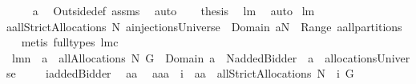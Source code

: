 \begin{isabellebody}
\ \isamarkupfalse%
\ {\isachardoublequoteopen}{\isachardot}{\isachardot}{\isachardot}\ {\isacharequal}\ a{\isachardoublequoteclose}\ \isamarkupfalse%
\ Outside{\isacharunderscore}def\ assms{\isacharparenleft}{}{\isacharparenright}\ \isamarkupfalse%
\ auto\ \isanewline
{}\isamarkupfalse%
\ \isamarkupfalse%
\ {\isacharquery}thesis\ \isamarkupfalse%
\ lm{}{}\ \isamarkupfalse%
\ auto\isanewline
{}\isamarkupfalse%
%
\endisatagproof
{\isafoldproof}%
%
\isadelimproof
%
\endisadelimproof
\isanewline
\isanewline
{}\isamarkupfalse%
\ lm{}{}{\isacharcolon}\ \isanewline
{\isachardoublequoteopen}a{\isasymin}allStrictAllocations{\isacharprime}\ N\ {\isasymOmega}{\isacharequal}{\isacharparenleft}a{\isasymin}injectionsUniverse\ {\isacharampersand}\ Domain\ a{\isasymsubseteq}N\ {\isacharampersand}\ Range\ a{\isasymin}all{\isacharunderscore}partitions\ {\isasymOmega}{\isacharparenright}{\isachardoublequoteclose}\ \isanewline
%
\isadelimproof
%
\endisadelimproof
%
\isatagproof
{}\isamarkupfalse%
\ {\isacharparenleft}metis\ {\isacharparenleft}full{\isacharunderscore}types{\isacharparenright}\ lm{}{}c{\isacharparenright}%
\endisatagproof
{\isafoldproof}%
%
\isadelimproof
\isanewline
%
\endisadelimproof
\isanewline
{}\isamarkupfalse%
\ lm{}{}n{\isacharcolon}\ \ {\isachardoublequoteopen}a\ {\isasymin}\ allAllocations{\isacharprime}{\isacharprime}{\isacharprime}\ N\ G{\isachardoublequoteclose}\ \ {\isachardoublequoteopen}Domain\ a\ {\isasymsubseteq}\ N{\isacharminus}{\isacharbraceleft}addedBidder{\isacharprime}{\isacharbraceright}\ {\isacharampersand}\ a\ {\isasymin}\ allocationsUniverse{\isachardoublequoteclose}\ \ \isanewline
%
\isadelimproof
%
\endisadelimproof
%
\isatagproof
{}\isamarkupfalse%
\ {\isacharminus}\isanewline
{}\isamarkupfalse%
\ {\isacharquery}i{\isacharequal}{\isachardoublequoteopen}addedBidder{\isacharprime}{\isachardoublequoteclose}\ \isamarkupfalse%
\ aa\ \isanewline
{}{\isacharcolon}\ {\isachardoublequoteopen}a{\isacharequal}aa\ {\isacharminus}{\isacharminus}\ {\isacharquery}i\ {\isacharampersand}\ aa\ {\isasymin}\ allStrictAllocations{\isacharprime}{\isacharprime}{\isacharprime}\ {\isacharparenleft}N\ {\isasymunion}\ {\isacharbraceleft}{\isacharquery}i{\isacharbraceright}{\isacharparenright}\ G{\isachardoublequoteclose}\ \isamarkupfalse%

\end{isabellebody}
